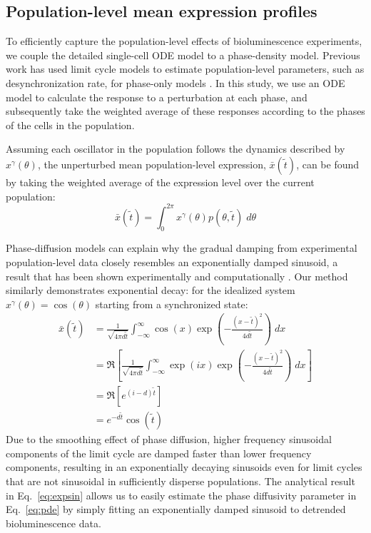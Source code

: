 \documentclass[11pt, letterpaper]{article}
\begin{document}
\subsection*{Population-level mean expression profiles}

To efficiently capture the population-level effects of bioluminescence experiments, we couple the detailed single-cell ODE model to a phase-density model.
Previous work has used limit cycle models to estimate population-level parameters, such as desynchronization rate, for phase-only models \cite{Rougemont2007}.
In this study, we use an ODE model to calculate the response to a perturbation at each phase, and subsequently take the weighted average of these responses according to the phases of the cells in the population.

Assuming each oscillator in the population follows the dynamics described by $x^\gamma(\theta)$, the unperturbed mean population-level expression, $\bar{x}(\tilde{t})$, can be found by taking the weighted average of the expression level over the current population:
\begin{equation}
  \bar{x}(\tilde{t}) = \int_0^{2\pi} x^\gamma(\theta) p(\theta, \tilde{t}) \;
  d\theta
  \label{eq:xbar}
\end{equation}

Phase-diffusion models can explain why the gradual damping from experimental population-level data closely resembles an exponentially damped sinusoid, a result that has been shown experimentally \cite{Welsh2004} and computationally \cite{Rougemont2007}.
Our method similarly demonstrates exponential decay: for the idealized system $x^\gamma(\theta) = \cos(\theta)$ starting from a synchronized state:
\begin{align}
  \bar{x}(\tilde{t}) &= \frac{1}{\sqrt{4\pi d\tilde{t}}}\int_{-\infty}^{\infty}
  \cos(x) \exp\left(-\frac{(x - \tilde{t})^2}{4d\tilde{t}}\right)\; dx \\
  &= \Re\left[\frac{1}{\sqrt{4\pi d\tilde{t}}}\int_{-\infty}^{\infty}
    \exp(ix) \exp\left(-\frac{(x - \tilde{t})^2}{4d\tilde{t}}\right)\; dx\right] \\
    &= \Re\left[e^{(i - d)\tilde{t}}\right]\\
    &= e^{-d\tilde{t}} \cos(\tilde{t}) \label{eq:expsin}
\end{align}
Due to the smoothing effect of phase diffusion, higher frequency sinusoidal components of the limit cycle are damped faster than lower frequency components, resulting in an exponentially decaying sinusoids even for limit cycles that are not sinusoidal in sufficiently disperse populations.
The analytical result in Eq.~\ref{eq:expsin} allows us to easily estimate the phase diffusivity parameter in Eq.~\ref{eq:pde} by simply fitting an exponentially damped sinusoid to detrended bioluminescence data.
\end{document}
